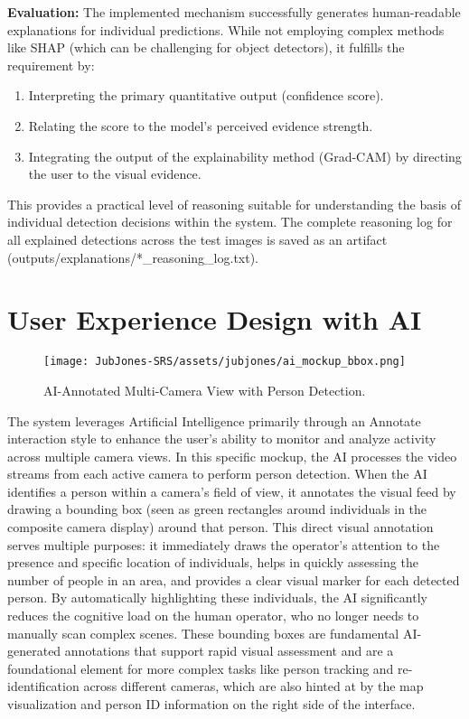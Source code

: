 \textbf{Evaluation:}
The implemented mechanism successfully generates human-readable explanations for individual predictions. While not employing complex methods like SHAP (which can be challenging for object detectors), it fulfills the requirement by:
\begin{enumerate}
    \item  Interpreting the primary quantitative output (confidence score).
    \item  Relating the score to the model's perceived evidence strength.
    \item  Integrating the output of the explainability method (Grad-CAM) by directing the user to the visual evidence.
\end{enumerate}
This provides a practical level of reasoning suitable for understanding the basis of individual detection decisions within the system. The complete reasoning log for all explained detections across the test images is saved as an artifact ({outputs/explanations/*\_reasoning\_log.txt}).


\section{User Experience Design with AI}
\label{section:ux_design} %

\begin{figure}[H]
    \centering
    \texttt{[image: JubJones-SRS/assets/jubjones/ai\_mockup\_bbox.png]}
    \caption{AI-Annotated Multi-Camera View with Person Detection.}
    \label{fig:ai_mockup_bbox}
\end{figure}

The system leverages Artificial Intelligence primarily through an Annotate interaction style to enhance the user's ability to monitor and analyze activity across multiple camera views. In this specific mockup, the AI processes the video streams from each active camera to perform person detection.
When the AI identifies a person within a camera's field of view, it annotates the visual feed by drawing a bounding box (seen as green rectangles around individuals in the composite camera display) around that person. This direct visual annotation serves multiple purposes: it immediately draws the operator's attention to the presence and specific location of individuals, helps in quickly assessing the number of people in an area, and provides a clear visual marker for each detected person. By automatically highlighting these individuals, the AI significantly reduces the cognitive load on the human operator, who no longer needs to manually scan complex scenes. These bounding boxes are fundamental AI-generated annotations that support rapid visual assessment and are a foundational element for more complex tasks like person tracking and re-identification across different cameras, which are also hinted at by the map visualization and person ID information on the right side of the interface.

